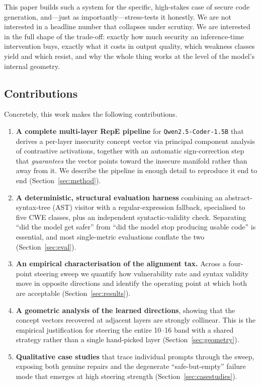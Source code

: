 \documentclass[11pt,a4paper]{article}
\begin{document}
This paper builds such a system for the specific, high-stakes case of secure code generation, and---just as importantly---stress-tests it honestly. We are not interested in a headline number that collapses under scrutiny. We are interested in the full shape of the trade-off: exactly how much security an inference-time intervention buys, exactly what it costs in output quality, which weakness classes yield and which resist, and why the whole thing works at the level of the model's internal geometry.

\subsection{Contributions}
Concretely, this work makes the following contributions.

\begin{enumerate}
  \item \textbf{A complete multi-layer RepE pipeline} for \texttt{Qwen2.5-Coder-1.5B} that derives a per-layer insecurity concept vector via principal component analysis of contrastive activations, together with an automatic sign-correction step that \emph{guarantees} the vector points toward the insecure manifold rather than away from it. We describe the pipeline in enough detail to reproduce it end to end (Section~\ref{sec:method}).
  \item \textbf{A deterministic, structural evaluation harness} combining an abstract-syntax-tree (AST) visitor with a regular-expression fallback, specialised to five CWE classes, plus an independent syntactic-validity check. Separating ``did the model get safer'' from ``did the model stop producing usable code'' is essential, and most single-metric evaluations conflate the two (Section~\ref{sec:eval}).
  \item \textbf{An empirical characterisation of the alignment tax.} Across a four-point steering sweep we quantify how vulnerability rate and syntax validity move in opposite directions and identify the operating point at which both are acceptable (Section~\ref{sec:results}).
  \item \textbf{A geometric analysis of the learned directions}, showing that the concept vectors recovered at adjacent layers are strongly collinear. This is the empirical justification for steering the entire 10--16 band with a shared strategy rather than a single hand-picked layer (Section~\ref{sec:geometry}).
  \item \textbf{Qualitative case studies} that trace individual prompts through the sweep, exposing both genuine repairs and the degenerate ``safe-but-empty'' failure mode that emerges at high steering strength (Section~\ref{sec:casestudies}).
\end{enumerate}
\end{document}
